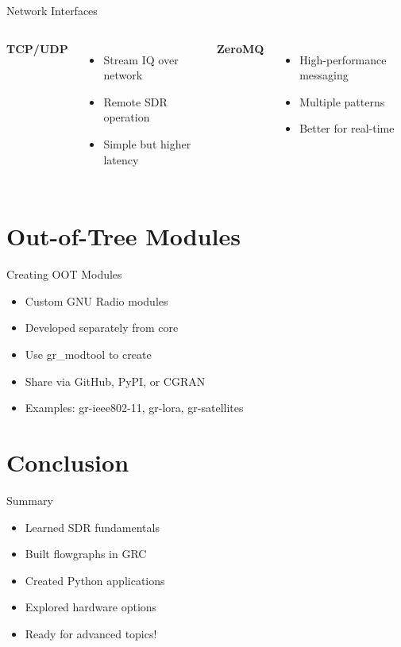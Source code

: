 \documentclass[aspectratio=169,11pt]{beamer}
\begin{document}
\begin{frame}{Network Interfaces}
\begin{columns}
\textbf{TCP/UDP}
\begin{itemize}
    \item Stream IQ over network
    \item Remote SDR operation
    \item Simple but higher latency
\end{itemize}

\textbf{ZeroMQ}
\begin{itemize}
    \item High-performance messaging
    \item Multiple patterns
    \item Better for real-time
\end{itemize}
\end{columns}
\end{frame}

\section{Out-of-Tree Modules}
\begin{frame}{Creating OOT Modules}
\begin{itemize}
    \item Custom GNU Radio modules
    \item Developed separately from core
    \item Use gr\_modtool to create
    \item Share via GitHub, PyPI, or CGRAN
    \item Examples: gr-ieee802-11, gr-lora, gr-satellites
\end{itemize}
\end{frame}

\section{Conclusion}
\begin{frame}{Summary}
\begin{itemize}
    \item Learned SDR fundamentals
    \item Built flowgraphs in GRC
    \item Created Python applications
    \item Explored hardware options
    \item Ready for advanced topics!
\end{itemize}
\end{frame}
\end{document}
